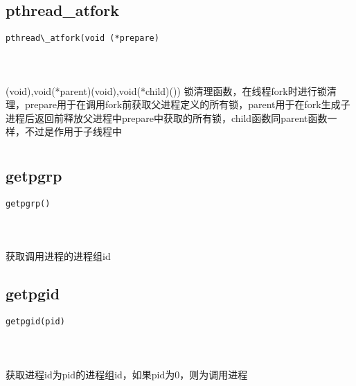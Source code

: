 \documentclass[10pt,a4paper]{article}
\begin{document}
\subsection{pthread\_atfork}
\begin{spacing}{2.0}
\lstset{language=C,numbers=none}
\begin{lstlisting}
pthread\_atfork(void (*prepare)
\end{lstlisting}
{\large\color[rgb]{0.2,0.4,0.6}{(*prepare:}}
\paragraph{ \ \ }(void),void(*parent)(void),void(*child)()) 锁清理函数，在线程fork时进行锁清理，prepare用于在调用fork前获取父进程定义的所有锁，parent用于在fork生成子进程后返回前释放父进程中prepare中获取的所有锁，child函数同parent函数一样，不过是作用于子线程中
\end{spacing}

\section{\color[rgb]{0.2,0.4,0.6}{会话组}}
\subsection{getpgrp}
\begin{spacing}{2.0}
\lstset{language=C,numbers=none}
\begin{lstlisting}
getpgrp()
\end{lstlisting}
\paragraph{ \ \ }获取调用进程的进程组id
\end{spacing}

\subsection{getpgid}
\begin{spacing}{2.0}
\lstset{language=C,numbers=none}
\begin{lstlisting}
getpgid(pid)
\end{lstlisting}
{\large\color[rgb]{0.2,0.4,0.6}{pid:}}
\paragraph{ \ \ }获取进程id为pid的进程组id，如果pid为0，则为调用进程
\end{spacing}
\end{document}
